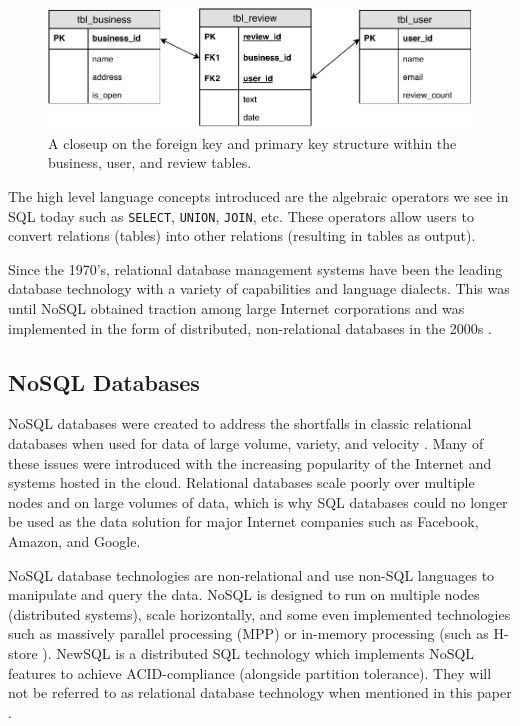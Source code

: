 \begin{figure}[h]
    \centering
    \includegraphics[width=13cm]{img/foreign-key.pdf}
    \caption{A closeup on the foreign key and primary key structure within the business, user, and review tables.}
    \label{fig:foreign-key}
\end{figure}

The high level language concepts introduced are the algebraic operators we see in SQL today such as \verb|SELECT|, \verb|UNION|, \verb|JOIN|, etc. These operators allow users to convert relations (tables) into other relations (resulting in tables as output).

Since the 1970's, relational database management systems have been the leading database technology with a variety of capabilities and language dialects. This was until NoSQL obtained traction among large Internet corporations and was implemented in the form of distributed, non-relational databases in the 2000s \cite{data-in-nosql}.

\subsection{NoSQL Databases}
\label{nosql-database}

NoSQL databases were created to address the shortfalls in classic relational databases when used for data of large volume, variety, and velocity \cite{nosql-db}. Many of these issues were introduced with the increasing popularity of the Internet and systems hosted in the cloud. Relational databases scale poorly over multiple nodes and on large volumes of data, which is why SQL databases could no longer be used as the data solution for major Internet companies such as Facebook, Amazon, and Google.

NoSQL database technologies are non-relational and use non-SQL languages to manipulate and query the data. NoSQL is designed to run on multiple nodes (distributed systems), scale horizontally, and some even implemented technologies such as massively parallel processing (MPP) \cite{tigergraph-mpp} or in-memory processing (such as H-store \cite{hstore}). NewSQL is a distributed SQL technology which implements NoSQL features to achieve ACID-compliance (alongside partition tolerance). They will not be referred to as relational database technology when mentioned in this paper \cite{nosql-db}.


